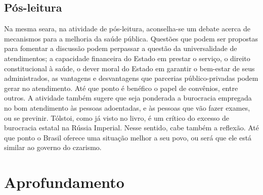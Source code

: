 \documentclass[12pt]{extarticle}
\begin{document}
\subsection{Pós-leitura}


Na mesma seara, na atividade de pós-leitura, aconselha-se um
debate acerca de mecanismos para a melhoria da saúde pública. Questões
que podem ser propostas para fomentar a discussão podem perpassar a
questão da universalidade de atendimentos; a capacidade financeira do
Estado em prestar o serviço, o direito constitucional à saúde, o dever
moral do Estado em garantir o bem-estar de seus administrados, as
vantagens e desvantagens que parcerias público-privadas podem gerar no
atendimento. Até que ponto é benéfico o papel de convênios, entre
outros. A atividade também sugere que seja ponderada a burocracia
empregada no bom atendimento às pessoas adoentadas, e às pessoas que vão
fazer exames, ou se previnir. Tólstoi, como já visto no livro, é um
crítico do excesso de burocracia estatal na Rússia Imperial. Nesse
sentido, cabe também a reflexão. Até que ponto o Brasil oferece uma
situação melhor a seu povo, ou será que ele está similar ao governo do
czarismo.

\section{Aprofundamento}
\end{document}
